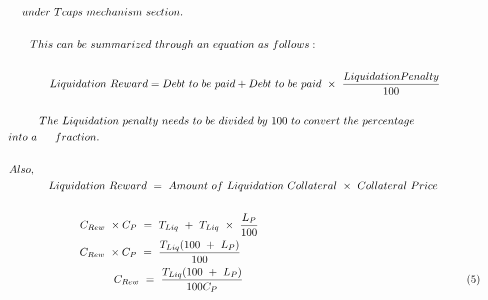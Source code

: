 {\begin{gather}
under\ Tcaps\ mechanism\ section.\ \ \ \ \ \ \ \ \ \ \ \ \ \ \ \ \ \ \ \ \ \ \ \ \ \ \ \ \ \ \ \ \ \ \ \ \ \ \ \ \ \ \ \ \ \ \ \ \ \ \ \ \ \ \ \ \ \ \ \ \ \ \ \ \ \ \ \ \ \ \ \ \ \ \ \ \ \ \  \notag\\
\  \notag\\
This\ can\ be\ summarized\ through\ an\ equation\ as\ follows:\ \ \ \ \ \ \ \ \ \ \ \ \ \ \ \ \ \ \ \ \ \ \ \ \ \ \ \ \ \ \ \ \ \ \ \ \ \ \ \  \notag\\
\ \ \ \ \ \ \ \ \ \  \notag\\
Liquidation\ Reward=Debt\ to\ be\ paid+Debt\ to\ be\ paid\ \times \ \frac{LiquidationPenalty}{100} \notag\\
 \notag\\
\ \ \ The\ Liquidation\ penalty\ needs\ to\ be\ divided\ by\ 100\ to\ convert\ the\ percentage\ \ \ \ \ \ \ \ \ \ \ \ \  \notag\\
\ \ \ \ into\ a\ \ \ \ \ fraction.\ \ \ \ \ \ \ \ \ \ \ \ \ \ \ \ \ \ \ \ \ \ \ \ \ \ \ \ \ \ \ \ \ \ \ \ \ \ \ \ \ \ \ \ \ \ \ \ \ \ \ \ \ \ \ \ \ \ \ \ \ \ \ \ \ \ \ \ \ \ \ \ \ \ \ \ \ \ \ \ \ \ \ \ \ \ \ \ \ \ \ \ \ \ \ \ \ \ \ \ \ \ \ \ \ \ \ \ \ \  \notag\\
\ \ \ \ \ \ \ \ \ \ \ \ \ \ \ \ \ \ \ \ \ \ \ \ \ \ \ \ \ \ \ \ \ \ \ \ \ \ \ \ \ \ \ \ \ \ \ \ \ \ \ \ \ \ \ \ \ \ \ \ \ \ \ \ \ \ \ \ \ \ \ \ \ \ \ \ \ \ \ \  \notag\\
\ Also,\ \ \ \ \ \ \ \ \ \ \ \ \ \ \ \ \ \ \ \ \ \ \ \ \ \ \ \ \ \ \ \ \ \ \ \ \ \ \ \ \ \ \ \ \ \ \ \ \ \ \ \ \ \ \ \ \ \ \ \ \ \ \ \ \ \ \ \ \ \ \ \ \ \ \ \ \ \ \ \ \ \ \ \ \ \ \ \ \ \ \ \ \ \ \ \ \ \ \ \ \ \ \ \ \ \ \ \ \ \ \ \ \ \ \ \ \ \ \ \ \ \ \ \ \  \notag\\
Liquidation\ Reward\ =\ Amount\ of\ Liquidation\ Collateral\ \times \ Collateral\ Price\  \notag\\
\ \ \ \ \ \ \ \ \ \ \ \ \ \ \ \ \ \ \ \ \ \ \ \ \ \ \ \ \ \ \ \ \ \ \ \ \ \ \ \ \ \ \ \ \ \ \ \ \ \ \ \ \ \ \ \ \ \ \ \ \ \ \ \ \ \ \ \ \ \ \ \ \ \ \ \ \  \notag\\
C_{Rew} \ \times C_{P} \ =\ T_{Liq} \ +\ T_{Liq} \ \times \ \frac{L_{P}}{100} \ \ \ \ \ \ \ \ \ \ \ \ \ \ \ \ \ \ \ \ \ \ \ \ \ \ \ \ \ \ \ \ \ \ \ \ \ \ \ \ \ \  \notag\\
C_{Rew} \ \times C_{P} \ =\ \frac{T_{Liq}( 100\ +\ L_{P})}{100} \ \ \ \ \ \ \ \ \ \ \ \ \ \ \ \ \ \ \ \ \ \ \ \ \ \ \ \ \ \ \ \ \ \ \ \ \ \ \ \ \ \ \ \ \ \ \  \notag\\
\ \ \ \ \ \ \ \ \ \ \ \ \ \ \ \ \ \ \ \ \ \ \ \ \ \ \ \ \ C_{Rew} \ =\ \frac{T_{Liq}( 100\ +\ L_{P})}{100C_{P}} \ \ \ \ \ \ \ \ \ \ \ \ \ \ \ \ \ \ \ \ \ \ \ \ \ \ \ \ \ \ \ \ \ \ \ \ \ \ \ \ \ \ \ \ \ \ \ \ \ \ \ \ \ \ \ \ \ \ \ \ \ \ ( 5)\\

\end{gather}}
